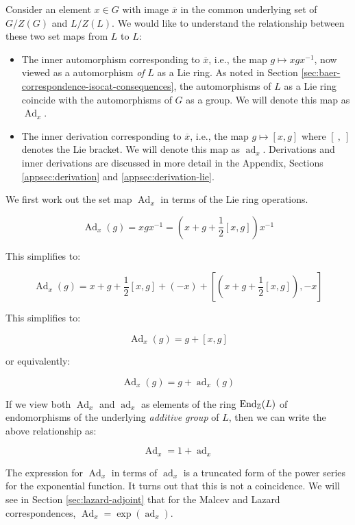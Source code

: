 Consider an element $x \in G$ with image $\overline{x}$ in the common
underlying set of $G/Z(G)$ and $L/Z(L)$. We would like to understand
the relationship between these two set maps from $L$ to $L$:

\begin{itemize}
\item The inner automorphism corresponding to $\overline{x}$, i.e.,
  the map $g \mapsto xgx^{-1}$, now viewed as a automorphism {\em of}
  $L$ as a Lie ring. As noted in Section
  \ref{sec:baer-correspondence-isocat-consequences}, the automorphisms
    of $L$ as a Lie ring coincide with the automorphisms of $G$ as a
    group. We will denote this map as $\operatorname{Ad}_x$.
\item The inner derivation corresponding to $\overline{x}$, i.e., the
  map $g \mapsto [x,g]$ where $[ \ , \ ]$ denotes the Lie bracket. We
  will denote this map as $\operatorname{ad}_x$. Derivations and inner
  derivations are discussed in more detail in the Appendix, Sections
  \ref{appsec:derivation} and \ref{appsec:derivation-lie}.
\end{itemize}

We first work out the set map $\operatorname{Ad}_x$ in terms of the
Lie ring operations.

$$\operatorname{Ad}_x(g) = xgx^{-1} = \left(x + g + \frac{1}{2}[x,g]\right)x^{-1}$$

This simplifies to:

$$\operatorname{Ad}_x(g) = x + g + \frac{1}{2}[x,g] + (-x) + \left[\left(x + g + \frac{1}{2}[x,g]\right),-x\right]$$

This simplifies to:

$$\operatorname{Ad}_x(g) = g + [x,g]$$

or equivalently:

$$\operatorname{Ad}_x(g) = g + \operatorname{ad}_x(g)$$

If we view both $\operatorname{Ad}_x$ and $\operatorname{ad}_x$ as
elements of the ring $\operatorname{End}_{\mathbb{Z}}(L)$ of endomorphisms of
the underlying {\em additive group} of $L$, then we can write the
above relationship as:

$$\operatorname{Ad}_x = 1 + \operatorname{ad}_x$$

The expression for $\operatorname{Ad}_x$ in terms of
$\operatorname{ad}_x$ is a truncated form of the power series for the
exponential function. It turns out that this is not a coincidence. We
will see in Section \ref{sec:lazard-adjoint} that for the Malcev and
  Lazard correspondences, $\operatorname{Ad}_x =
  \exp(\operatorname{ad}_x)$.

